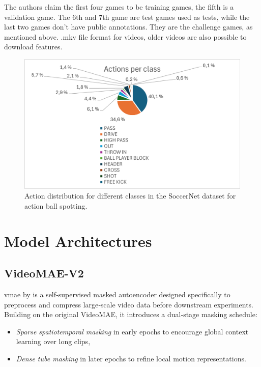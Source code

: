 The authors claim the first four games to be training games, the fifth is a validation game. The 6th and 7th game are test games used as tests, while the last two games don't have public annotations. They are the challenge games, as mentioned above. .mkv file format for videos, older videos are also possible to download features. 

\begin{figure}
    \centering
    \includegraphics[width=1\linewidth]{figures/actions_per_class.png}
    \caption{Action distribution for different classes in the SoccerNet dataset for action ball spotting.}
    \label{fig:soccernet_dist}
\end{figure}


\section{Model Architectures}
\label{sec:model_architectures}

\subsection{VideoMAE-V2}
\label{ssec:videomae_v2}

\acrfull{vmae} by \textcite{wang_videomae_2023} is a self‑supervised masked autoencoder designed specifically to preprocess and compress large‑scale video data before downstream experiments. Building on the original VideoMAE, it introduces a dual‑stage masking schedule: 

\begin{itemize}
    \item \emph{Sparse spatiotemporal masking} in early epochs to encourage global context learning over long clips,
    \item \emph{Dense tube masking} in later epochs to refine local motion representations.
\end{itemize}

